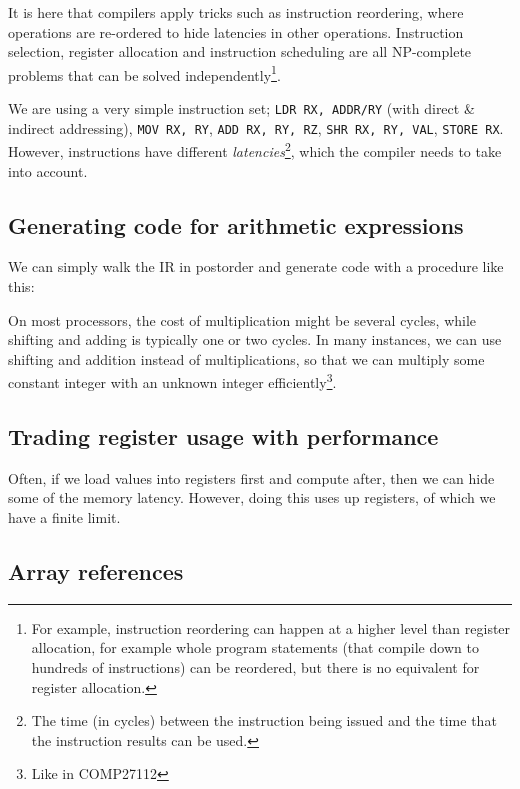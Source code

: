 It is here that compilers apply tricks such as instruction reordering,
where operations are re-ordered to hide latencies in other
operations. Instruction selection, register allocation and instruction
scheduling are all NP-complete problems that can be solved
independently\footnote{For example, instruction reordering can happen
at a higher level than register allocation, for example whole program
statements (that compile down to hundreds of instructions) can be
reordered, but there is no equivalent for register allocation.}.

We are using a very simple instruction set; \texttt{LDR RX, ADDR/RY}
(with direct \& indirect addressing), \texttt{MOV RX, RY}, \texttt{ADD
RX, RY, RZ}, \texttt{SHR RX, RY, VAL}, \texttt{STORE RX}. However,
instructions have different \textit{latencies}\footnote{The time (in
cycles) between the instruction being issued and the time that the
instruction results can be used.}, which the compiler needs to take
into account.

\subsection{Generating code for arithmetic expressions}


We can simply walk the IR in postorder and generate code with a
procedure like this:



On most processors, the cost of multiplication might be several
cycles, while shifting and adding is typically one or two cycles. In
many instances, we can use shifting and addition instead of
multiplications, so that we can multiply some constant integer with an
unknown integer efficiently\footnote{Like in COMP27112}.

\subsection{Trading register usage with performance}

Often, if we load values into registers first and compute after, then
we can hide some of the memory latency. However, doing this uses up
registers, of which we have a finite limit.


\subsection{Array references}

